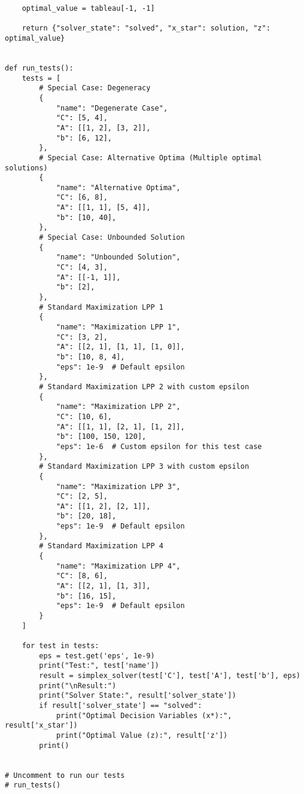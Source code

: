 \documentclass[12pt, legalpaper]{exam}
\begin{document}
\begin{verbatim}
    optimal_value = tableau[-1, -1]

    return {"solver_state": "solved", "x_star": solution, "z": optimal_value}


def run_tests():
    tests = [
        # Special Case: Degeneracy
        {
            "name": "Degenerate Case",
            "C": [5, 4],
            "A": [[1, 2], [3, 2]],
            "b": [6, 12],
        },
        # Special Case: Alternative Optima (Multiple optimal solutions)
        {
            "name": "Alternative Optima",
            "C": [6, 8],
            "A": [[1, 1], [5, 4]],
            "b": [10, 40],
        },
        # Special Case: Unbounded Solution
        {
            "name": "Unbounded Solution",
            "C": [4, 3],
            "A": [[-1, 1]],
            "b": [2],
        },
        # Standard Maximization LPP 1
        {
            "name": "Maximization LPP 1",
            "C": [3, 2],
            "A": [[2, 1], [1, 1], [1, 0]],
            "b": [10, 8, 4],
            "eps": 1e-9  # Default epsilon
        },
        # Standard Maximization LPP 2 with custom epsilon
        {
            "name": "Maximization LPP 2",
            "C": [10, 6],
            "A": [[1, 1], [2, 1], [1, 2]],
            "b": [100, 150, 120],
            "eps": 1e-6  # Custom epsilon for this test case
        },
        # Standard Maximization LPP 3 with custom epsilon
        {
            "name": "Maximization LPP 3",
            "C": [2, 5],
            "A": [[1, 2], [2, 1]],
            "b": [20, 18],
            "eps": 1e-9  # Default epsilon
        },
        # Standard Maximization LPP 4
        {
            "name": "Maximization LPP 4",
            "C": [8, 6],
            "A": [[2, 1], [1, 3]],
            "b": [16, 15],
            "eps": 1e-9  # Default epsilon
        }
    ]

    for test in tests:
        eps = test.get('eps', 1e-9)
        print("Test:", test['name'])
        result = simplex_solver(test['C'], test['A'], test['b'], eps)
        print("\nResult:")
        print("Solver State:", result['solver_state'])
        if result['solver_state'] == "solved":
            print("Optimal Decision Variables (x*):", result['x_star'])
            print("Optimal Value (z):", result['z'])
        print()


# Uncomment to run our tests
# run_tests()

\end{verbatim}
\end{document}
